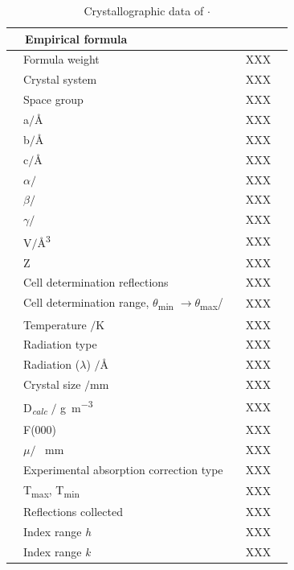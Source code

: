 \begin{table}[htp]
\caption[Crystallographic data of \ce{StBu-xantphos(H)]CPh(SO2CF3)2}$\cdot{}$ ]{Crystallographic data of \ce{StBu-xantphos(H)]CPh(SO2CF3)2}$\cdot{}$ } 
\label{table:crystalbisthixantphosplatinum:data}
\begin{center}
\begin{tabular}{l l}
	\toprule
	~~\bfseries{Empirical formula}~~&~~\fixme{XXXXX}\\
	\midrule	
	~~Formula weight~~		&~~XXX~~	\\
	~~Crystal system~~		&~~XXX~~	\\
	~~Space group~~		&~~XXX~~	\\
	~~a$/$\si{\angstrom}~~	&~~XXX~~	\\
	~~b$/$\si{\angstrom}~~	&~~XXX~~	\\
	~~c$/$\si{\angstrom}~~	&~~XXX~~	\\
	~~$\alpha/$\degrees~~	&~~XXX~~	\\
	~~$\beta/$\degrees~~	&~~XXX~~	\\
	~~$\gamma/$\degrees~~	&~~XXX~~	\\
	~~V$/$\si{\angstrom\cubed}&~~XXX~~	\\
	~~Z					&~~XXX~~	\\
	~~Cell determination reflections &~~XXX~~	\\
	~~Cell determination range, $\theta{}$\textsubscript{min} $\longrightarrow \theta{}$\textsubscript{max}/\degrees &~~XXX~~	\\
	~~Temperature $/$\si{\kelvin}	&~~XXX~~	\\
	~~Radiation type			&~~XXX~~	\\
	~~Radiation ($\lambda$) $/$\si{\angstrom}	&~~XXX~~	\\
	~~Crystal size $/$\si{\milli\metre}			&~~XXX~~	\\
	~~D\textsubscript{\emph{calc}} $/$ \si{\gram\per\metre\cubed}	&~~XXX~~	\\
	~~F(000)				&~~XXX~~	\\
	~~$\mu /$	\si{\per\milli\metre}		&~~XXX~~	\\
	~~Experimental absorption correction type	&~~XXX~~	\\
	~~T\textsubscript{max}, T\textsubscript{min}	&~~XXX~~	\\
	~~Reflections collected					&~~XXX~~	\\
	~~Index range \emph{h}		&~~XXX~~	\\
	~~Index range \emph{k}		&~~XXX~~	\\

\end{tabular}
\end{center}
\end{table}
